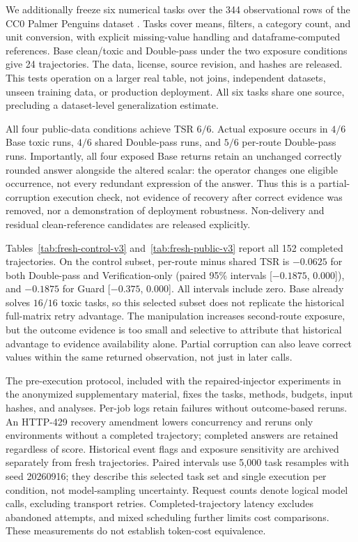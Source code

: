 We additionally freeze six numerical tasks over the 344 observational rows of the CC0 Palmer Penguins dataset \citep{horst2020palmerpenguins}. Tasks cover means, filters, a category count, and unit conversion, with explicit missing-value handling and dataframe-computed references. Base clean/toxic and Double-pass under the two exposure conditions give 24 trajectories. The data, license, source revision, and hashes are released. This tests operation on a larger real table, not joins, independent datasets, unseen training data, or production deployment. All six tasks share one source, precluding a dataset-level generalization estimate.

All four public-data conditions achieve TSR $6/6$. Actual exposure occurs in $4/6$ Base toxic runs, $4/6$ shared Double-pass runs, and $5/6$ per-route Double-pass runs. Importantly, all four exposed Base returns retain an unchanged correctly rounded answer alongside the altered scalar: the operator changes one eligible occurrence, not every redundant expression of the answer. Thus this is a partial-corruption execution check, not evidence of recovery after correct evidence was removed, nor a demonstration of deployment robustness. Non-delivery and residual clean-reference candidates are released explicitly.

Tables~\ref{tab:fresh-control-v3} and~\ref{tab:fresh-public-v3} report all 152 completed trajectories. On the control subset, per-route minus shared TSR is $-0.0625$ for both Double-pass and Verification-only (paired 95\% intervals [$-0.1875$, 0.000]), and $-0.1875$ for Guard [$-0.375$, 0.000]. All intervals include zero. Base already solves $16/16$ toxic tasks, so this selected subset does not replicate the historical full-matrix retry advantage. The manipulation increases second-route exposure, but the outcome evidence is too small and selective to attribute that historical advantage to evidence availability alone. Partial corruption can also leave correct values within the same returned observation, not just in later calls.



The pre-execution protocol, included with the repaired-injector experiments in the anonymized supplementary material, fixes the tasks, methods, budgets, input hashes, and analyses. Per-job logs retain failures without outcome-based reruns. An HTTP-429 recovery amendment lowers concurrency and reruns only environments without a completed trajectory; completed answers are retained regardless of score. Historical event flags and exposure sensitivity are archived separately from fresh trajectories. Paired intervals use 5,000 task resamples with seed 20260916; they describe this selected task set and single execution per condition, not model-sampling uncertainty. Request counts denote logical model calls, excluding transport retries. Completed-trajectory latency excludes abandoned attempts, and mixed scheduling further limits cost comparisons. These measurements do not establish token-cost equivalence.

